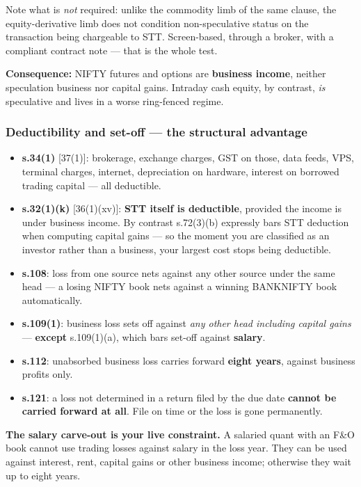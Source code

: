 \documentclass[11pt,a4paper]{article}
\begin{document}
Note what is \emph{not} required: unlike the commodity limb of the same clause,
the equity-derivative limb does not condition non-speculative status on the
transaction being chargeable to STT. Screen-based, through a broker, with a
compliant contract note --- that is the whole test.

\textbf{Consequence:} NIFTY futures and options are \textbf{business income},
neither speculation business nor capital gains. Intraday cash equity, by contrast,
\emph{is} speculative and lives in a worse ring-fenced regime.

\subsubsection{Deductibility and set-off --- the structural advantage}

\begin{itemize}
\item \textbf{s.34(1)} [37(1)]: brokerage, exchange charges, GST on those, data
feeds, VPS, terminal charges, internet, depreciation on hardware, interest on
borrowed trading capital --- all deductible.
\item \textbf{s.32(1)(k)} [36(1)(xv)]: \textbf{STT itself is deductible}, provided
the income is under business income. By contrast s.72(3)(b) expressly bars STT
deduction when computing capital gains --- so the moment you are classified as an
investor rather than a business, your largest cost stops being deductible.
\item \textbf{s.108}: loss from one source nets against any other source under the
same head --- a losing NIFTY book nets against a winning BANKNIFTY book automatically.
\item \textbf{s.109(1)}: business loss sets off against \emph{any other head
including capital gains} --- \textbf{except} s.109(1)(a), which bars set-off
against \textbf{salary}.
\item \textbf{s.112}: unabsorbed business loss carries forward \textbf{eight
years}, against business profits only.
\item \textbf{s.121}: a loss not determined in a return filed by the due date
\textbf{cannot be carried forward at all}. File on time or the loss is gone permanently.
\end{itemize}

\textbf{The salary carve-out is your live constraint.} A salaried quant with an
F\&O book cannot use trading losses against salary in the loss year. They can be
used against interest, rent, capital gains or other business income; otherwise
they wait up to eight years.
\end{document}
